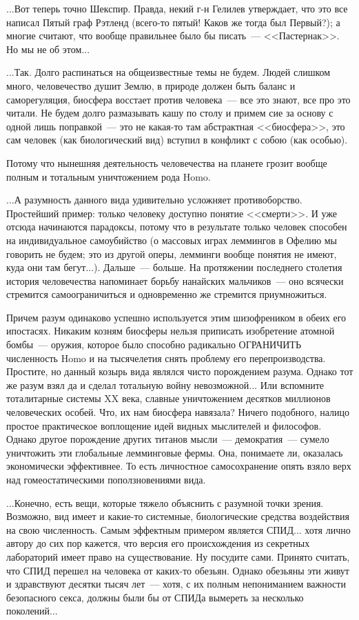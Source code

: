 \documentclass{scrbook}
\newcommand{\flqq}{<<}
\newcommand{\frqq}{>>}
\newcommand{\mdash}{~--- }
\begin{document}
...Вот теперь точно Шекспир. Правда, некий г-н Гелилев утверждает, что это все написал Пятый граф Рэтленд (всего-то пятый! Каков же тогда был Первый?); а многие считают, что вообще правильнее было бы писать{\mdash}{\flqq}Пастернак{\frqq}. Но мы не об этом...

...Так. Долго распинаться на общеизвестные темы не будем. Людей слишком много, человечество душит Землю, в природе должен быть баланс и саморегуляция, биосфера восстает против человека{\mdash}все это знают, все про это читали. Не будем долго размазывать кашу по столу и примем сие за основу с одной лишь поправкой{\mdash}это не какая-то там абстрактная {\flqq}биосфера{\frqq}, это сам человек (как биологический вид) вступил в конфликт с собою (как особью).

Потому что нынешняя деятельность человечества на планете грозит вообще полным и тотальным уничтожением рода Homo.

...А разумность данного вида удивительно усложняет противоборство. Простейший пример: только человеку доступно понятие {\flqq}смерти{\frqq}. И уже отсюда начинаются парадоксы, потому что в результате только человек способен на индивидуальное самоубийство (о массовых играх леммингов в Офелию мы говорить не будем; это из другой оперы, лемминги вообще понятия не имеют, куда они там бегут...). Дальше{\mdash}больше. На протяжении последнего столетия история человечества напоминает борьбу нанайских мальчиков{\mdash}оно всячески стремится самоограничиться и одновременно же стремится приумножиться.

Причем разум одинаково успешно используется этим шизофреником в обеих его ипостасях. Никаким козням биосферы нельзя приписать изобретение атомной бомбы{\mdash}оружия, которое было способно радикально ОГРАНИЧИТЬ численность Homo и на тысячелетия снять проблему его перепроизводства. Простите, но данный козырь вида являлся чисто порождением разума. Однако тот же разум взял да и сделал тотальную войну невозможной... Или вспомните тоталитарные системы XX века, славные уничтожением десятков миллионов человеческих особей. Что, их нам биосфера навязала? Ничего подобного, налицо простое практическое воплощение идей видных мыслителей и философов. Однако другое порождение других титанов мысли{\mdash}демократия{\mdash}сумело уничтожить эти глобальные лемминговые фермы. Она, понимаете ли, оказалась экономически эффективнее. То есть личностное самосохранение опять взяло верх над гомеостатическими поползновениями вида.

...Конечно, есть вещи, которые тяжело объяснить с разумной точки зрения. Возможно, вид имеет и какие-то системные, биологические средства воздействия на свою численность. Самым эффектным примером является СПИД... хотя лично автору до сих пор кажется, что версия его происхождения из секретных лабораторий имеет право на существование. Ну посудите сами. Принято считать, что СПИД перешел на человека от каких-то обезьян. Однако обезьяны эти живут и здравствуют десятки тысяч лет{\mdash}хотя, с их полным непониманием важности безопасного секса, должны были бы от СПИДа вымереть за несколько поколений...
\end{document}
